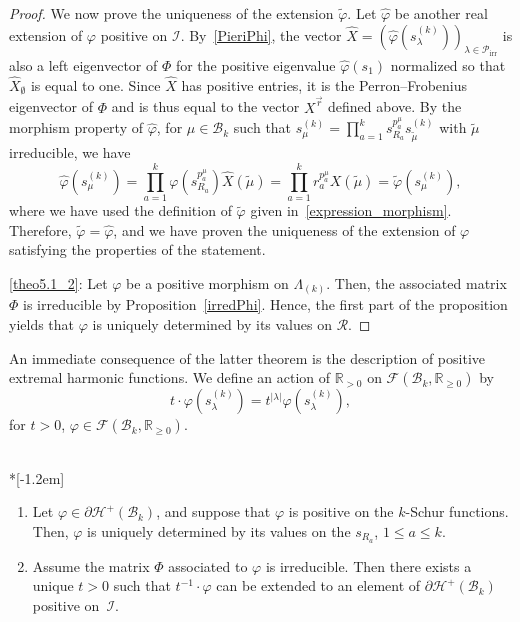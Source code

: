 \documentclass[ALCO,ThmDefs,Unicode,epreuves]{cedram}
\DeclareMathOperator{\irr}{irr}
\begin{document}
\begin{proof}
We now prove the uniqueness of the extension $\widetilde{\varphi}$. Let
$\widehat{\varphi}$ be another real extension of $\varphi$ positive on
$\mathcal{I}$. By~\eqref{PieriPhi}, the vector $\widehat{X}=(\widehat{\varphi
}(s_{\lambda}^{(k)}))_{\lambda\in\mathcal{P}_{\irr }}$ is also a left
eigenvector of $\Phi$ for the positive eigenvalue $\widehat{\varphi}(s_{1})$
normalized so that $\widehat{X}_{\emptyset}$ is equal to one. Since
$\widehat{X}$ has positive entries, it is the Perron--Frobenius eigenvector of
$\Phi$ and is thus equal to the vector $X^{\vec{r}}$ defined above. By the
morphism property of $\widehat{\varphi}$, for $\mu\in\mathcal{B}_{k}$ such
that $s_{\mu}^{(k)}=\prod_{a=1}^{k}s_{R_{a}}^{p_{a}^{\mu}}s_{\widetilde{\mu}%
}^{(k)}$ with $\tilde{\mu}$ irreducible, we have
\begin{equation}
\widehat{\varphi}(s_{\mu}^{(k)})=\prod_{a=1}^{k}\varphi(s_{R_{a}}^{p_{a}^{\mu
}})\widehat{X}(\widetilde{\mu})=\prod_{a=1}^{k}r_{a}^{p_{a}^{\mu}}%
X(\widetilde{\mu})=\widetilde{\varphi}(s_{\mu}^{(k)}),
\end{equation}
where we have used the definition of $\widetilde{\varphi}$ given in~\eqref{expression_morphism}. 
Therefore, $\widetilde{\varphi}=\widehat{\varphi
}$, and we have proven the uniqueness of the extension of $\varphi$ satisfying
the properties of the statement.

\eqref{theo5.1_2}: Let $\varphi$ be a positive morphism on $\Lambda_{(k)}$. Then, the
associated matrix $\Phi$ is irreducible by Proposition~\ref{irredPhi}. Hence,
the first part of the proposition yields that $\varphi$ is uniquely determined
by its values on $\mathcal{R}$.
\end{proof}

An immediate consequence of the latter theorem is the description of positive
extremal harmonic functions. We define an action of $\mathbb{R}_{>0}$ on
$\mathcal{F}(\mathcal{B}_{k},\mathbb{R}_{\geq0})$ by
\[
t\cdot\varphi(s_{\lambda}^{(k)})=t^{\left\vert \lambda\right\vert }%
\varphi(s_{\lambda}^{(k)}),
\]
for $t>0$, $\varphi\in\mathcal{F}(\mathcal{B}_{k},\mathbb{R}_{\geq0})$.

\begin{coro}\ \\*[-1.2em] 

\begin{enumerate}
\item Let $\varphi\in\partial\mathcal{H}^{+}(\mathcal{B}_{k})$, and suppose
that $\varphi$ is positive on the $k$-Schur functions. Then, $\varphi$ is
uniquely determined by its values on the $s_{R_{a}}$, $1\leq a\leq k$.

\item Assume the matrix $\Phi$ associated to $\varphi$ is irreducible. Then
there exists a unique $t>0$ such that $t^{-1}\cdot\varphi$ can be extended to
an element of $\partial\mathcal{H}^{+}(\mathcal{B}_{k})$ positive on~$\mathcal{I}$.
\end{enumerate}
\end{coro}
\end{document}
